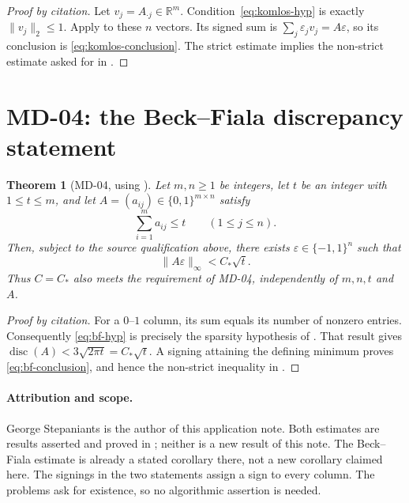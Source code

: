 \documentclass[11pt,a4paper]{article}
\newcommand{\R}{\mathbb{R}}
\DeclareMathOperator{\disc}{disc}
\newcommand{\Cstar}{C_{\!*}}
\newtheorem{theorem}{Theorem}
\begin{document}
\begin{proof}[Proof by citation]
Let $v_j=A_{\cdot j}\in\R^m$. Condition~\eqref{eq:komlos-hyp} is exactly
$\|v_j\|_2\leq1$. Apply \cite[Theorem~1.1, p.~1]{GFL26} to these $n$
vectors. Its signed sum is $\sum_j\varepsilon_jv_j=A\varepsilon$, so its
conclusion is \eqref{eq:komlos-conclusion}. The strict estimate implies
the non-strict estimate asked for in \cite{MD03}.
\end{proof}

\section{MD-04: the Beck--Fiala discrepancy statement}

\begin{theorem}[MD-04, using {\cite[Corollary~1.2]{GFL26}}]
Let $m,n\geq1$ be integers, let $t$ be an integer with $1\leq t\leq m$,
and let $A=(a_{ij})\in\{0,1\}^{m\times n}$ satisfy
\begin{equation}\label{eq:bf-hyp}
  \sum_{i=1}^{m}a_{ij}\leq t
  \qquad (1\leq j\leq n).
\end{equation}
Then, subject to the source qualification above, there exists
$\varepsilon\in\{-1,1\}^{n}$ such that
\begin{equation}\label{eq:bf-conclusion}
  \|A\varepsilon\|_{\infty}<\Cstar\sqrt{t}.
\end{equation}
Thus $C=\Cstar$ also meets the requirement of MD-04, independently of
$m,n,t$ and $A$.
\end{theorem}

\begin{proof}[Proof by citation]
For a $0$--$1$ column, its sum equals its number of nonzero entries.
Consequently \eqref{eq:bf-hyp} is precisely the sparsity hypothesis of
\cite[Corollary~1.2, p.~2]{GFL26}. That result gives
$\disc(A)<3\sqrt{2\pi t}=\Cstar\sqrt t$.
A signing attaining the defining minimum proves
\eqref{eq:bf-conclusion}, and hence the non-strict inequality in
\cite{MD04}.
\end{proof}

\paragraph{Attribution and scope.}
George Stepaniants is the author of this application note.
Both estimates are results asserted and proved in \cite{GFL26}; neither
is a new result of this note. The Beck--Fiala estimate is already a
stated corollary there, not a new corollary claimed here. The signings
in the two statements assign a sign to every column. The problems
\cite{MD03,MD04} ask for existence, so no algorithmic assertion is needed.
\end{document}

